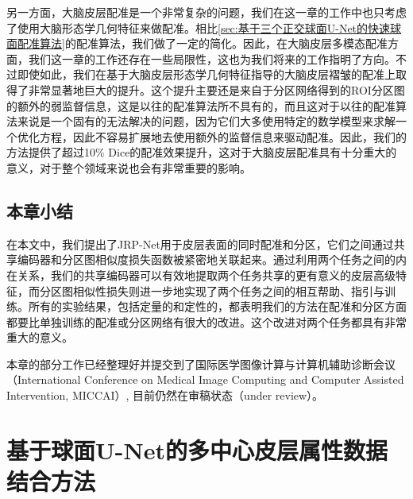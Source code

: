 另一方面，大脑皮层配准是一个非常复杂的问题，我们在这一章的工作中也只考虑了使用大脑形态学几何特征来做配准。相比\ref{sec:基于三个正交球面U-Net的快速球面配准算法}的配准算法，我们做了一定的简化。因此，在大脑皮层多模态配准方面，我们这一章的工作还存在一些局限性，这也为我们将来的工作指明了方向。不过即使如此，我们在基于大脑皮层形态学几何特征指导的大脑皮层褶皱的配准上取得了非常显著地巨大的提升。这个提升主要还是来自于分区网络得到的ROI分区图的额外的弱监督信息，这是以往的配准算法所不具有的，而且这对于以往的配准算法来说是一个固有的无法解决的问题，因为它们大多使用特定的数学模型来求解一个优化方程，因此不容易扩展地去使用额外的监督信息来驱动配准。因此，我们的方法提供了超过10\% Dice的配准效果提升，这对于大脑皮层配准具有十分重大的意义，对于整个领域来说也会有非常重要的影响。

\section{本章小结}
在本文中，我们提出了JRP-Net用于皮层表面的同时配准和分区，它们之间通过共享编码器和分区图相似度损失函数被紧密地关联起来。通过利用两个任务之间的内在关系，我们的共享编码器可以有效地提取两个任务共享的更有意义的皮层高级特征，而分区图相似性损失则进一步地实现了两个任务之间的相互帮助、指引与训练。所有的实验结果，包括定量的和定性的，都表明我们的方法在配准和分区方面都要比单独训练的配准或分区网络有很大的改进。这个改进对两个任务都具有非常重大的意义。

本章的部分工作已经整理好并提交到了国际医学图像计算与计算机辅助诊断会议（International Conference on Medical Image Computing and Computer Assisted Intervention, MICCAI）, 目前仍然在审稿状态（under review）。







\chapter{基于球面U-Net的多中心皮层属性数据结合方法}\label{sec:基于球面U-Net的多中心皮层属性数据结合方法}


